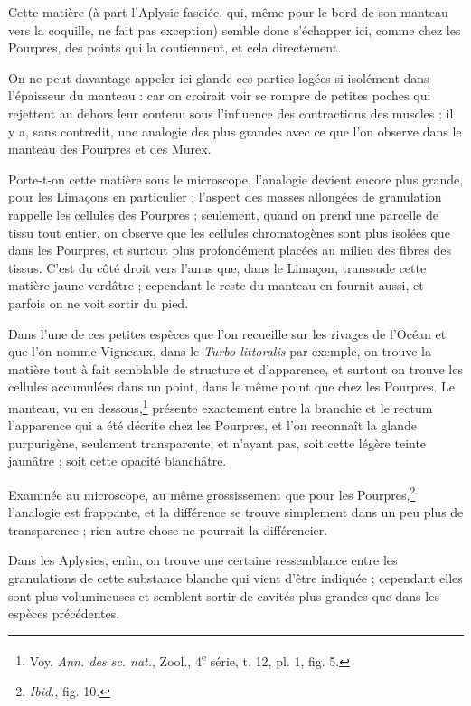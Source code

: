 \documentclass[a4paper, 11pt, oneside, polutonikogreek, french]{article}
\begin{document}
Cette matière (à part l'Aplysie fasciée, qui, même pour le bord de son manteau vers la coquille, ne fait pas exception) semble donc s'échapper ici, comme chez les Pourpres, des points qui la contiennent, et cela directement.

On ne peut davantage appeler ici glande ces parties logées si isolément dans l'épaisseur du manteau : car on croirait voir se rompre de petites poches qui rejettent au dehors leur contenu sous l'influence des contractions des muscles ; il y a, sans contredit, une analogie des plus grandes avec ce que l'on observe dans le manteau des Pourpres et des Murex.

Porte-t-on cette matière sous le microscope, l'analogie devient encore plus grande, pour les Limaçons en particulier ; l'aspect des masses allongées de granulation rappelle les cellules des Pourpres ; seulement, quand on prend une parcelle de tissu tout entier, on observe que les cellules chromatogènes sont plus isolées que dans les Pourpres, et surtout plus profondément placées au milieu des fibres des tissus. C'est du côté droit vers l'anus que, dans le Limaçon, transsude cette matière jaune verdâtre ; cependant le reste du manteau en fournit aussi, et parfois on ne voit sortir du pied.

Dans l'une de ces petites espèces que l'on recueille sur les rivages de l'Océan et que l'on nomme Vigneaux, dans le \emph{Turbo littoralis} par exemple, on trouve la matière tout à fait semblable de structure et d'apparence, et surtout on trouve les cellules accumulées dans un point, dans le même point que chez les Pourpres. Le manteau, vu en dessous,\footnote{Voy. \emph{Ann. des sc. nat.}, Zool., 4\textsuperscript{e} série, t. 12, pl. 1, fig. 5.} présente exactement entre la branchie et le rectum l'apparence qui a été décrite chez les Pourpres, et l'on reconnaît la glande purpurigène, seulement transparente, et n'ayant pas, soit cette légère teinte jaunâtre ; soit cette opacité blanchâtre.

Examinée au microscope, au même grossissement que pour les Pourpres,\footnote{\emph{Ibid.}, fig. 10.} l'analogie est frappante, et la différence se trouve simplement dans un peu plus de transparence ; rien autre chose ne pourrait la différencier.

Dans les Aplysies, enfin, on trouve une certaine ressemblance entre les granulations de cette substance blanche qui vient d'être indiquée ; cependant elles sont plus volumineuses et semblent sortir de cavités plus grandes que dans les espèces précédentes.
\end{document}
